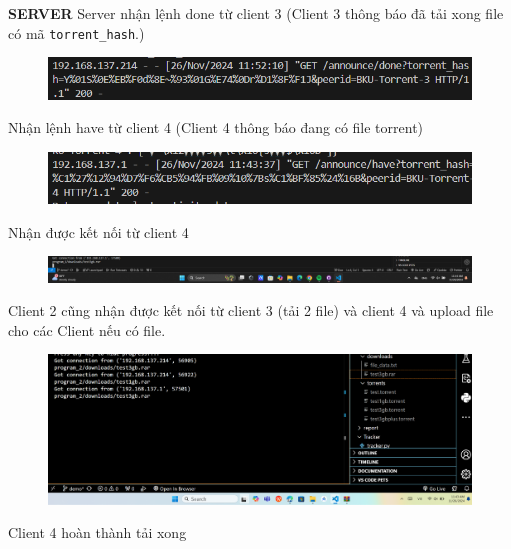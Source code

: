 \documentclass[a4paper]{article}
\begin{document}
\noindent \textbf{SERVER}
Server nhận lệnh done từ client 3 (Client 3 thông báo đã tải xong file có mã \texttt{torrent\_hash}.)	
\begin{figure}[H]
    \centering
    \includegraphics[width=1\textwidth]{images/33.png}
    \captionsetup{labelformat=empty}
\end{figure}
Nhận lệnh have từ client 4 (Client 4 thông báo đang có file torrent)
\begin{figure}[H]
    \centering
    \includegraphics[width=1\textwidth]{images/18.png}
    \captionsetup{labelformat=empty}
\end{figure}
Nhận được kết nối từ client 4
\begin{figure}[H]
    \centering
    \includegraphics[width=1\textwidth]{images/19.png}
    \captionsetup{labelformat=empty}
\end{figure}
Client 2 cũng nhận được kết nối từ client 3 (tải 2 file) và client 4 và upload file cho các Client nếu có file.
\begin{figure}[H]
    \centering
    \includegraphics[width=1\textwidth]{images/20.png}
    \captionsetup{labelformat=empty}
\end{figure}
Client 4 hoàn thành tải xong
\end{document}
